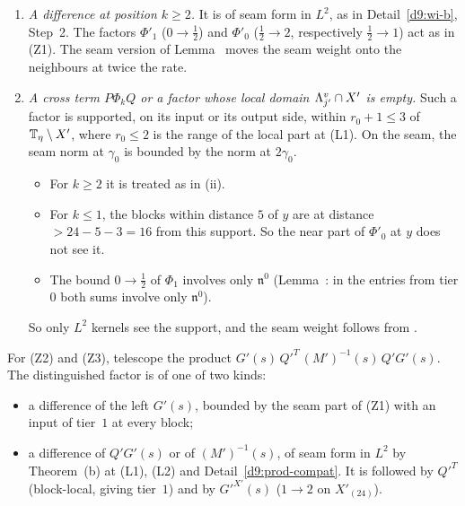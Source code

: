 \begin{detail}
\begin{step}[Seams]
\begin{enumerate}[label=(\roman*)]
So this factor maps $0\to3\subset0\to2$ in seam form, with no near part. The same holds for $\varphi D\delta v$, giving tier~$2$, and for the averaging commutator, giving tier~$1$. If the distinguished factor is $\Phi_1$, the factor $\Phi'_0$ to its left maps $\frac12\to2$, and the seam version of Lemma~ (Lemma~(e)) composes, with $\Phi'_0$ at $2\gamma_0$ and the distinguished factor at $\gamma_0$.
\item \emph{A difference at position $k\ge2$.} It is of seam form in $L^2$, as in Detail~\ref{d9:wi-b}, Step~2. The factors $\Phi'_1$ ($0\to\frac12$) and $\Phi'_0$ ($\frac12\to2$, respectively $\frac12\to1$) act as in (Z1). The seam version of Lemma~ moves the seam weight onto the neighbours at twice the rate.
\item \emph{A cross term $P\Phi_kQ$ or a factor whose local domain $\Lambda^v_{j'}\cap X'$ is empty.} Such a factor is supported, on its input or its output side, within $r_0+1\le3$ of $\mathbb T_\eta\setminus X'$, where $r_0\le2$ is the range of the local part at (L1). On the seam, the seam norm at $\gamma_0$ is bounded by the norm at $2\gamma_0$.
\begin{itemize}
\item For $k\ge2$ it is treated as in (ii).
\item For $k\le1$, the blocks within distance $5$ of $y$ are at distance $>24-5-3=16$ from this support. So the near part of $\Phi'_0$ at $y$ does not see it.
\item The bound $0\to\frac12$ of $\Phi_1$ involves only $\mathfrak n^0$ (Lemma~: in the entries from tier $0$ both sums involve only $\mathfrak n^0$).
\end{itemize}
So only $L^2$ kernels see the support, and the seam weight follows from .
\end{enumerate}
For (Z2) and (Z3), telescope the product $G'(s)\,Q'^T\,(M')^{-1}(s)\,Q'G'(s)$. The distinguished factor is of one of two kinds:
\begin{itemize}
\item a difference of the left $G'(s)$, bounded by the seam part of (Z1) with an input of tier~$1$ at every block;
\item a difference of $Q'G'(s)$ or of $(M')^{-1}(s)$, of seam form in $L^2$ by Theorem~(b) at (L1), (L2) and Detail~\ref{d9:prod-compat}. It is followed by $Q'^T$ (block-local, giving tier~$1$) and by $G'^{X'}(s)$ ($1\to2$ on $X'_{(24)}$).

\end{itemize}
\end{step}
\end{detail}
